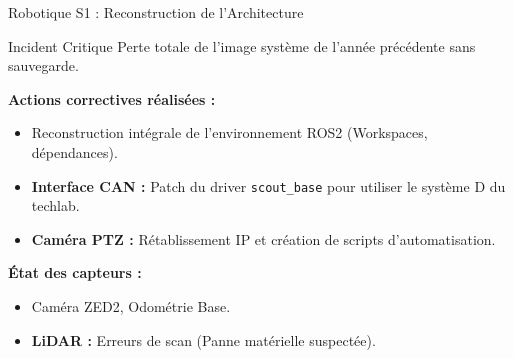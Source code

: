 \documentclass[aspectratio=169]{beamer}
\begin{document}
\begin{frame}{Robotique S1 : Reconstruction de l'Architecture}
    \begin{block}{Incident Critique}
        Perte totale de l'image système de l'année précédente sans sauvegarde.
    \end{block}

    \vspace{0.3cm}

    \textbf{Actions correctives réalisées :}
    \begin{itemize}
        \item Reconstruction intégrale de l'environnement ROS2 (Workspaces, dépendances).
        \item \textbf{Interface CAN :} Patch du driver \texttt{scout\_base} pour utiliser le système D du techlab.
        \item \textbf{Caméra PTZ :} Rétablissement IP et création de scripts d'automatisation.
    \end{itemize}

    \vspace{0.3cm}
    \textbf{État des capteurs :}
    \begin{itemize}
        \item[\textcolor{green}{\checkmark}] Caméra ZED2, Odométrie Base.
        \item[\textcolor{red}{\textbf{!}}] \textbf{LiDAR :} Erreurs de scan (Panne matérielle suspectée).
    \end{itemize}
\end{frame}
\end{document}
